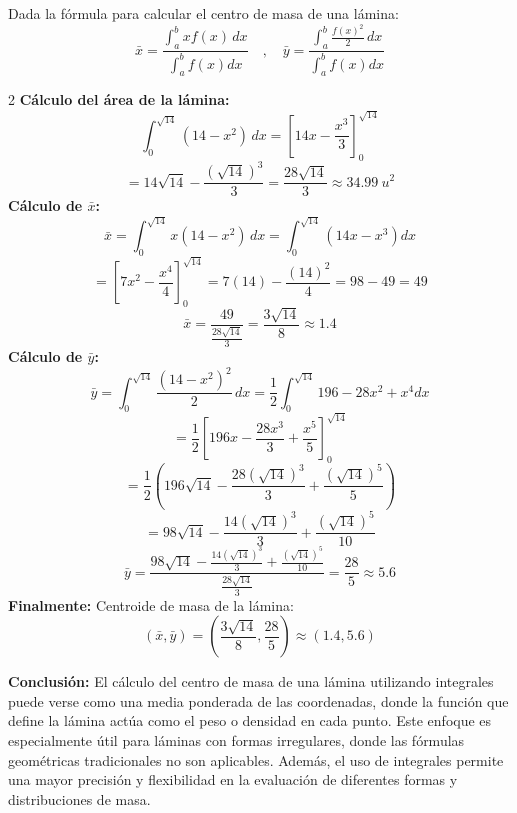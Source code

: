 Dada la fórmula para calcular el centro de masa de una lámina:
\[\bar{x} = \frac{\int_{a}^{b} xf(x) \, dx}{\int_{a}^{b} f(x) dx} \quad , \quad \bar{y} = \frac{\int_{a}^{b} \frac{f(x)^{2}}{2} \, dx}{\int_{a}^{b} f(x) dx} \]

\begin{multicols}{2}
  \textbf{Cálculo del área de la lámina:}
  \[\int_0^{\sqrt{14}} (14 - x^{2}) \, dx = \left[ 14x - \frac{x^{3}}{3} \right]_0^{\sqrt{14}}\]
  \[ = 14\sqrt{14} - \frac{(\sqrt{14})^{3}}{3} = \frac{28\sqrt{14}}{3} \approx 34.99\ u^{2}\]
  \textbf{Cálculo de $\bar{x}$:}
  \[\bar{x} = \int_0^{\sqrt{14}} x(14 - x^{2}) \, dx = \int_0^{\sqrt{14}}\left(14x-x^{3}\right)dx\]
  \[= \left[ 7x^{2} - \frac{x^{4}}{4} \right]_0^{\sqrt{14}} = 7(14) - \frac{(14)^{2}}{4} = 98 - 49 = 49\]
  \[\bar{x} = \frac{49}{\frac{28\sqrt{14}}{3}} = \frac{3\sqrt{14}}{8} \approx 1.4\]
  \textbf{Cálculo de $\bar{y}$:}
  \[\bar{y} = \int_0^{\sqrt{14}} \frac{(14 - x^{2})^{2}}{2} \, dx = \frac{1}{2}\int_0^{\sqrt{14}} 196 - 28x^{2} + x^{4} dx\]  
  \[= \frac{1}{2} \left[ 196x - \frac{28x^{3}}{3} + \frac{x^{5}}{5} \right]_0^{\sqrt{14}}\]
  \[=\frac{1}{2} \left( 196\sqrt{14} - \frac{28(\sqrt{14})^{3}}{3} + \frac{(\sqrt{14})^{5}}{5} \right)\]
  \[=98\sqrt{14} - \frac{14(\sqrt{14})^{3}}{3} + \frac{(\sqrt{14})^{5}}{10} \]
  \[\bar{y} = \frac{98\sqrt{14} - \frac{14(\sqrt{14})^{3}}{3} + \frac{(\sqrt{14})^{5}}{10}}{\frac{28\sqrt{14}}{3}} = \frac{28}{5} \approx 5.6\]
  \textbf{Finalmente:} Centroide de masa de la lámina:
  \[(\bar{x}, \bar{y}) = \left(\frac{3\sqrt{14}}{8}, \frac{28}{5}\right) \approx (1.4, 5.6)\]
\end{multicols}
\begin{center}
\end{center}
\textbf{Conclusión:} El cálculo del centro de masa de una lámina utilizando integrales puede verse como una media ponderada de las coordenadas, donde la función que define la lámina actúa como el peso o densidad en cada punto. Este enfoque es especialmente útil para láminas con formas irregulares, donde las fórmulas geométricas tradicionales no son aplicables. Además, el uso de integrales permite una mayor precisión y flexibilidad en la evaluación de diferentes formas y distribuciones de masa.

